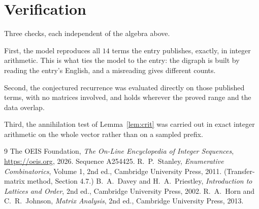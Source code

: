 \documentclass[11pt,a4paper]{article}
\theoremstyle{plain}
\theoremstyle{definition}
\begin{document}
\section{Verification}

Three checks, each independent of the algebra above.

First, the model reproduces all $14$ terms the entry publishes, exactly, in integer
arithmetic. This is what ties the model to the entry: the digraph is built by reading the
entry's English, and a misreading gives different counts.

Second, the conjectured recurrence was evaluated directly on those published terms, with no
matrices involved, and holds wherever the proved range and the data overlap.

Third, the annihilation test of Lemma~\ref{lem:crit} was carried out in exact integer
arithmetic on the whole vector rather than on a sampled prefix.

\begin{thebibliography}{9}
 The OEIS Foundation, \emph{The On-Line Encyclopedia of Integer
Sequences}, \url{https://oeis.org}, 2026. Sequence A254425.
 R.~P.~Stanley, \emph{Enumerative Combinatorics}, Volume 1, 2nd ed.,
Cambridge University Press, 2011. (Transfer-matrix method, Section 4.7.)
 B.~A.~Davey and H.~A.~Priestley, \emph{Introduction to Lattices and
Order}, 2nd ed., Cambridge University Press, 2002.
 R.~A.~Horn and C.~R.~Johnson, \emph{Matrix Analysis}, 2nd ed., Cambridge
University Press, 2013.
\end{thebibliography}
\end{document}
